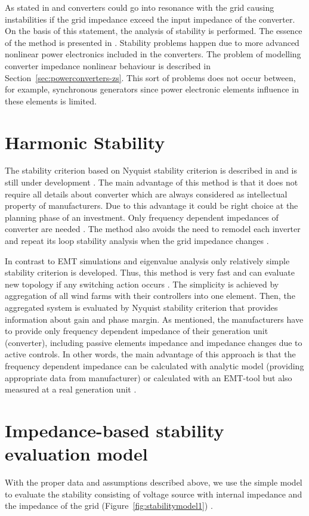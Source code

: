 \documentclass[12pt]{report} %
\begin{document}
As stated in \cite{sun2011} and \cite{liusun2014} converters could go into resonance with the grid causing instabilities if the grid impedance exceed the input impedance of the converter. On the basis of this statement, the analysis of stability is performed. The essence of the method is presented in \cite{middlebrook1976}. Stability problems happen due to more advanced nonlinear power electronics included in the converters. The problem of modelling converter impedance nonlinear behaviour is described in Section~\ref{sec:powerconverters-zs}. This sort of problems does not occur between, for example, synchronous generators since power electronic elements influence in these elements is limited.

\section{Harmonic Stability}
The stability criterion based on Nyquist stability criterion is described in \cite{sun2011} and is still under development \cite{borwin1}. The main advantage of this method is that it does not require all details about converter which are always considered as intellectual property of manufacturers. Due to this advantage it could be right choice at the planning phase of an investment. Only frequency dependent impedances of converter are needed \cite{borwin1}. The method also avoids the need to remodel each inverter and repeat its loop stability analysis when the grid impedance changes \cite{sun2011}.

In contrast to EMT simulations and eigenvalue analysis only relatively simple stability criterion is developed. Thus, this method is very fast and can evaluate new topology if any switching action occurs \cite{borwin1}. The simplicity is achieved by aggregation of all wind farms with their controllers into one element. Then, the aggregated system is evaluated by Nyquist stability criterion that provides information about gain and phase margin. As mentioned, the manufacturers have to provide only frequency dependent impedance of their generation unit (converter), including passive elements impedance and impedance changes due to active controls. In other words, the main advantage of this approach is that the frequency dependent impedance can be calculated with analytic model (providing appropriate data from manufacturer) or calculated with an EMT-tool but also measured at a real generation unit \cite{borwin1}.

\section{Impedance-based stability evaluation model} \label{sec:stabilitymodel}
With the proper data and assumptions described above, we use the simple model to evaluate the stability consisting of voltage source with internal impedance and the impedance of the grid (Figure~\ref{fig:stabilitymodel1}) \cite{sun2011, borwin1}.
\end{document}
